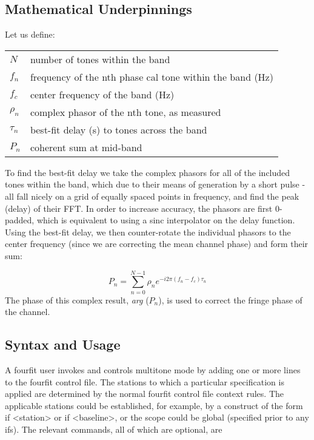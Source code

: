 \subsection{Mathematical Underpinnings}
Let us define:

\begin{tabular}{ll}
   $N$       &  number of tones within the band \\
   $f_n$     &  frequency of the nth phase cal tone within the band (Hz) \\
   $f_c$     &  center frequency of the band (Hz) \\
   $\rho_n$  &  complex phasor of the nth tone, as measured \\
   $\tau_n$  &  best-fit delay (s) to tones across the band \\
   $P_n$     &  coherent sum at mid-band \\
\end{tabular}

To find the best-fit delay we take the complex phasors for all of the included tones
within the band, which due to their means of generation by a short pulse - all fall
nicely on a grid of equally spaced points in frequency, and find the peak (delay)
of their FFT. In order to increase accuracy, the phasors are first 0-padded, which
is equivalent to using a sinc interpolator on the delay function. Using the best-fit
delay, we then counter-rotate the individual phasors to the center frequency
(since we are correcting the mean channel phase) and form their sum:

    
\begin{equation}
        P_n = \sum_{n=0}^{N-1} \rho_n e^{-i2\pi(f_n-f_c)\tau_n}
\end{equation}
\vspace{0.3in}
The phase of this complex result, \textit{arg} ($P_n$), is used to correct the 
fringe phase of the channel.
 
\subsection{Syntax and Usage}

A fourfit user invokes and controls multitone mode by adding one or more lines 
to the fourfit control file. The stations to which a particular specification 
is applied are determined by the normal fourfit control file context rules. 
The applicable stations could be established, for example, by a construct 
of the form if <station> or if <baseline>, or the scope could be global 
(specified prior to any ifs). The relevant commands, all of which are optional, are


